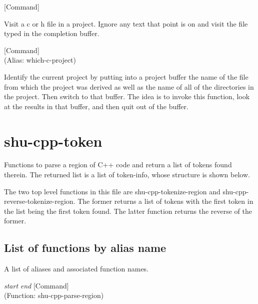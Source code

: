 \vspace{1em}
\noindent
{}
\usebox{\funcname}
 \hfill [Command]

\begin{doc-string}
Visit a c or h file in a project.  Ignore any text that point is on and visit the
file typed in the completion buffer.
\end{doc-string}

\vspace{1em}
\noindent
{}
\usebox{\funcname}
 \hfill [Command]\\%
 (Alias: which-c-project)

\begin{doc-string}
Identify the current project by putting into a project buffer the name of the file
from which the project was derived as well as the name of all of the directories in the
project.  Then switch to that buffer.  The idea is to invoke this function, look at the
results in that buffer, and then quit out of the buffer.
\end{doc-string}

\section{shu-cpp-token}


Functions to parse a region of C++ code and return a list of tokens
found therein.  The returned list is a list of token-info, whose structure
is shown below.

The two top level functions in this file are shu-cpp-tokenize-region and
shu-cpp-reverse-tokenize-region.  The former returns a list of tokens with the
first token in the list being the first token found.  The latter function
returns the reverse of the former.


\subsection{List of functions by alias name}

A list of aliases and associated function names.



\vspace{1em}
\noindent
{}
\usebox{\funcname}\emph{start} \emph{end}
 \hfill [Command]\\%
 (Function: shu-cpp-parse-region)

